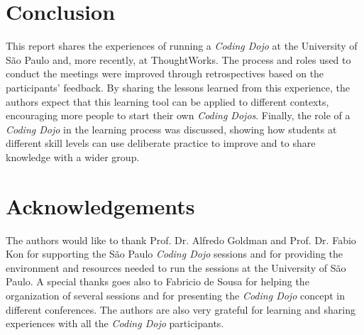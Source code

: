 \section{Conclusion}\label{sec:conclusion}

This report shares the experiences of running a \emph{Coding Dojo} at the University of São Paulo and, more
recently, at ThoughtWorks. The process and roles used to conduct the meetings were improved through
retrospectives based on the participants' feedback. By sharing the lessons learned from this experience, the
authors expect that this learning tool can be applied to different contexts, encouraging more people to
start their own \emph{Coding Dojos}. Finally, the role of a \emph{Coding Dojo} in the learning process
was discussed, showing how students at different skill levels can use deliberate practice to improve and to
share knowledge with a wider group.

\section*{Acknowledgements}

The authors would like to thank Prof. Dr. Alfredo Goldman and Prof. Dr. Fabio Kon for supporting the São Paulo
\emph{Coding Dojo} sessions and for providing the environment and resources needed to run the sessions at the
University of São Paulo. A special thanks goes also to Fabricio de Sousa for helping the organization of several
sessions and for presenting the \emph{Coding Dojo} concept in different conferences. The authors are also very
grateful for learning and sharing experiences with all the \emph{Coding Dojo} participants.  